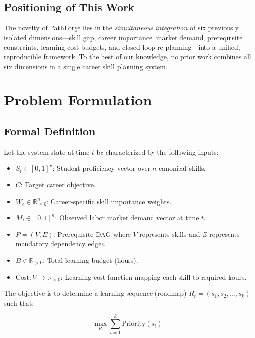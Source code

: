 \documentclass[conference]{IEEEtran}
\begin{document}
\subsection{Positioning of This Work}

The novelty of PathForge lies in the \emph{simultaneous integration} of six previously isolated dimensions---skill gap, career importance, market demand, prerequisite constraints, learning cost budgets, and closed-loop re-planning---into a unified, reproducible framework. To the best of our knowledge, no prior work combines all six dimensions in a single career skill planning system.

\section{Problem Formulation}

\subsection{Formal Definition}

Let the system state at time $t$ be characterized by the following inputs:

\begin{itemize}
    \item $S_t \in [0,1]^n$: Student proficiency vector over $n$ canonical skills.
    \item $C$: Target career objective.
    \item $W_c \in \mathbb{R}_{\geq 0}^n$: Career-specific skill importance weights.
    \item $M_t \in [0,1]^n$: Observed labor market demand vector at time $t$.
    \item $P = (V, E)$: Prerequisite DAG where $V$ represents skills and $E$ represents mandatory dependency edges.
    \item $B \in \mathbb{R}_{>0}$: Total learning budget (hours).
    \item $\text{Cost}: V \rightarrow \mathbb{R}_{>0}$: Learning cost function mapping each skill to required hours.
\end{itemize}

\noindent The objective is to determine a learning sequence (roadmap) $R_t = (s_1, s_2, \dots, s_k)$ such that:

\begin{equation}
\max_{R_t} \sum_{i=1}^{k} \text{Priority}(s_i)
\label{eq:objective}
\end{equation}
\end{document}
